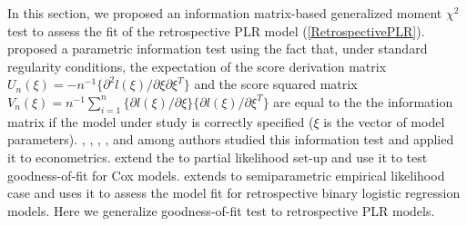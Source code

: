 \documentclass[12]{interact}
\theoremstyle{plain}%
\theoremstyle{definition}
\theoremstyle{remark}
\begin{document}
In this section, we proposed an information matrix-based generalized moment $\chi^2$ test to assess the fit of the retrospective PLR model (\ref{RetrospectivePLR}). \cite{White-1982} proposed a parametric information test using the fact that, under standard regularity conditions, the expectation of the score derivation matrix $U_n(\xi)=-n^{-1}\{\partial^2l(\xi)/\partial \xi \partial\xi^T\}$ and the score squared matrix $V_n(\xi)=n^{-1}\sum_{i=1}^n\{\partial l(\xi)/\partial\xi \}\{\partial l(\xi)/\partial\xi ^T \}$ are equal to the the information matrix if the model under study is correctly specified ($\xi$ is the vector of model parameters). \cite{Hausman-SpecificationTest-Economitrica-1978}, \cite{Hausman-McFadden-Specification-GLM-Economitica-1984}, \cite{Holly-SpecificationTest-Economitrica-1982}, \cite{Newey-GMSpecification-J-Economics-1985, Newey-MLE-CondMomentTest-Specification-Economitrica-1985}, and among authors studied this information test and applied it to econometrics. \cite{Lin-Wei-GOF-CoxModel-Sinica-1991} extend the \cite{White-1982} to partial likelihood set-up and use it to test goodness-of-fit for Cox models. \cite{ZhangBiao-Biometrika-2001} extends to semiparametric empirical likelihood case and uses it to assess the model fit for retrospective binary logistic regression models. Here we generalize \cite{ZhangBiao-Biometrika-2001} goodness-of-fit test to retrospective PLR models.
\end{document}
